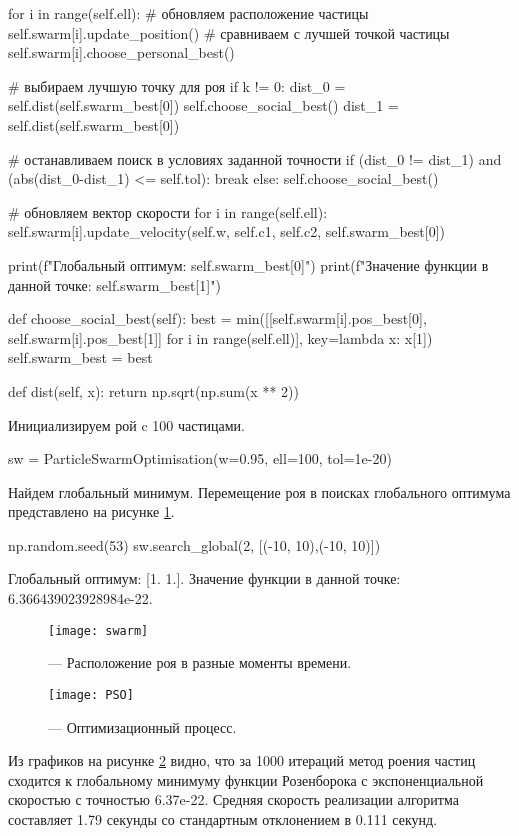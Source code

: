 \newpage
\begin{pyprint}
       for i in range(self.ell):
          # обновляем расположение частицы
          self.swarm[i].update_position()
          # сравниваем с лучшей точкой частицы
          self.swarm[i].choose_personal_best()

       # выбираем лучшую точку для роя
       if k != 0:
          dist_0 = self.dist(self.swarm_best[0])
          self.choose_social_best()
          dist_1 = self.dist(self.swarm_best[0])

          # останавливаем поиск в условиях заданной точности
          if (dist_0 != dist_1) and (abs(dist_0-dist_1) <= self.tol):
             break
       else:
          self.choose_social_best()

       # обновляем вектор скорости
       for i in range(self.ell):
          self.swarm[i].update_velocity(self.w, self.c1,
                                        self.c2, self.swarm_best[0])

    print(f"Глобальный оптимум: {self.swarm_best[0]}")
    print(f"Значение функции в данной точке: {self.swarm_best[1]}")

  def choose_social_best(self):
    best = min([[self.swarm[i].pos_best[0],
                 self.swarm[i].pos_best[1]] for i in range(self.ell)],
                 key=lambda x: x[1])
    self.swarm_best = best

  def dist(self, x):
    return np.sqrt(np.sum(x ** 2))
\end{pyprint}

Инициализируем рой c 100 частицами.
\begin{pyin}
sw = ParticleSwarmOptimisation(w=0.95, ell=100, tol=1e-20)
\end{pyin}

Найдем глобальный минимум. Перемещение роя в поисках глобального оптимума представлено на рисунке \ref{img:swarm}.
\begin{pyin}
np.random.seed(53)
sw.search_global(2, [(-10, 10),(-10, 10)])
\end{pyin}

\begin{pyout}
Глобальный оптимум: [1. 1.].
Значение функции в данной точке: 6.366439023928984e-22.
\end{pyout}

\begin{figure}[h!]
\centering
\texttt{[image: swarm]}
\caption{ --- Расположение роя в разные моменты времени.}
\label{img:swarm}
\end{figure}

\begin{figure}[h!]
\centering
\texttt{[image: PSO]}
\caption{ --- Оптимизационный процесс.}
\label{img:PSO}
\end{figure}

Из графиков на рисунке \ref{img:PSO} видно, что за 1000 итераций метод роения частиц сходится к глобальному минимуму функции Розенборока с экспоненциальной скоростью с точностью 6.37e-22. Средняя скорость реализации алгоритма составляет 1.79 секунды со стандартным отклонением в 0.111 секунд.
